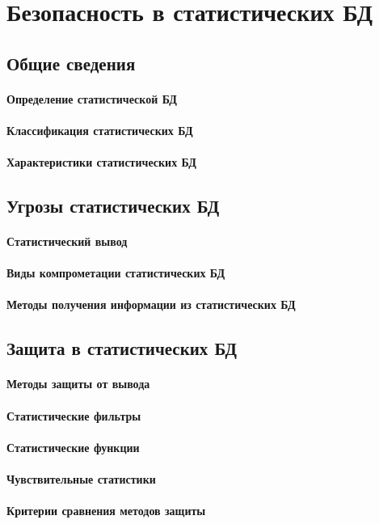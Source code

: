 \section{Безопасность в статистических БД}
\subsection{Общие сведения}
\paragraph{Определение статистической БД}
\paragraph{Классификация статистических БД}
\paragraph{Характеристики статистических БД}

\subsection{Угрозы статистических БД}
\paragraph{Статистический вывод}
\paragraph{Виды компрометации статистических БД}
\paragraph{Методы получения информации из статистических БД}

\subsection{Защита в статистических БД}
\paragraph{Методы защиты от вывода}
\paragraph{Статистические фильтры}
\paragraph{Статистические функции}
\paragraph{Чувствительные статистики}
\paragraph{Критерии сравнения методов защиты}
